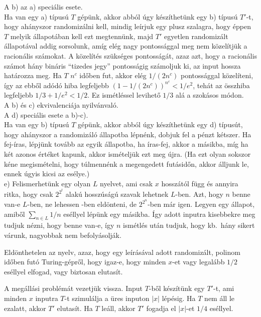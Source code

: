 \begin{Answer}
	A b) az a) speci\'alis esete.\\
	Ha van egy a) t\'ipus\'u $T$ g\'ep\"unk, akkor abb\'ol \'ugy k\'esz\'ithet\"unk egy b) t\'ipus\'u $T'$-t, hogy ah\'anyszor randomiz\'alni kell, mindig le\'irjuk egy plusz szalagra, hogy \'eppen $T$ melyik \'allapot\'aban kell ezt megtenn\"unk, majd $T'$ egyetlen randomiz\'alt \'allapot\'aval addig sorsolunk, am\'ig el\'eg nagy pontoss\'aggal meg nem k\"ozel\'itj\"uk a racion\'alis sz\'amokat.
	A k\"ozel\'it\'es sz\"uks\'eges pontoss\'ag\'at, azaz azt, hogy a racion\'alis sz\'amot h\'any bin\'aris ``tizedes jegy'' pontoss\'agig sz\'amoljuk ki, az input hossza hat\'arozza meg.
	Ha $T$ $n^c$ id\H oben fut, akkor el\'eg $1/(2n^c)$ pontoss\'aggal k\"ozel\'iteni, \'igy az ebb\H ol ad\'od\'o hiba legfeljebb $(1-1/(2n^c))^{n^c}<1/e^2$, teh\'at az \"osszhiba legfeljebb $1/3+1/e^2<1/2$.
	Ez ism\'etl\'essel levihet\H o $1/3$ al\'a a szok\'asos m\'odon.\\
	A b) \'es c) ekvivalenci\'aja nyilv\'anval\'o.\\
	A d) speci\'alis esete a b)-c).\\
	Ha van egy b) t\'ipus\'u $T$ g\'ep\"unk, akkor abb\'ol \'ugy k\'esz\'ithet\"unk egy d) t\'ipus\'ut, hogy ah\'anyszor a randomiz\'al\'o \'allapotba l\'epn\'enk, dobjuk fel a p\'enzt k\'etszer.
	Ha fej-\'iras, l\'epj\"unk tov\'abb az egyik \'allapotba, ha \'iras-fej, akkor a m\'asikba, m\'ig ha k\'et azonos \'ert\'eket kapunk, akkor ism\'etelj\"uk ezt meg \'ujra.
	(Ha ezt olyan sokszor k\'ene megism\'etelni, hogy t\'ulmenn\'enk a megengedett fut\'asid\H on, akkor \'alljunk le, ennek \'ugyis kicsi az es\'elye.)\\
	e) Felismerhet\"unk egy olyan $L$ nyelvet, ami csak $x$ hossz\'at\'ol f\"ugg \'es annyira ritka, hogy csak $2^{2^t}$ alak\'u hossz\'us\'ag\'u szavak lehetnek $L$-ben.
	Azt, hogy $n$ benne van-e $L$-ben, ne lehessen \EXP-ben eld\"onteni, de $2^{2^n}$-ben m\'ar igen.
	Legyen egy \'allapot, amib\H ol $\sum_{n\in L} 1/n$ es\'ellyel l\'ep\"unk egy m\'asikba.
	\'Igy adott inputra kisebbekre meg tudjuk n\'ezni, hogy benne van-e, \'igy $n$ ism\'etl\'es ut\'an tudjuk, hogy kb.\ h\'any sikert v\'arunk, nagyobbak nem befoly\'asolj\'ak.
\end{Answer}

\begin{Exercise}[counter={sorszam}, difficulty=0]
	Eld\"onthetelen az  nyelv, azaz, hogy egy le\'ir\'as\'aval adott randomiz\'alt, polinom id\H oben fut\'o Turing-g\'epr\H ol, hogy igaz-e, hogy
	minden $x$-et vagy legal\'abb $1/2$ es\'ellyel elfogad, vagy biztosan elutas\'it.
\end{Exercise}	
\begin{Answer}
	A meg\'all\'asi probl\'em\'at vezetj\"uk vissza.
	Input $T$-b\H ol k\'esz\'it\"unk egy $T'$-t, ami minden $x$ inputra $T$-t szimul\'alja a \"ures inputon $|x|$ l\'ep\'esig.
	Ha $T$ nem \'all le ezalatt, akkor $T'$ elutas\'it.
	Ha $T$ le\'all, akkor $T'$ fogadja el $|x|$-et $1/4$ es\'ellyel.
\end{Answer}


